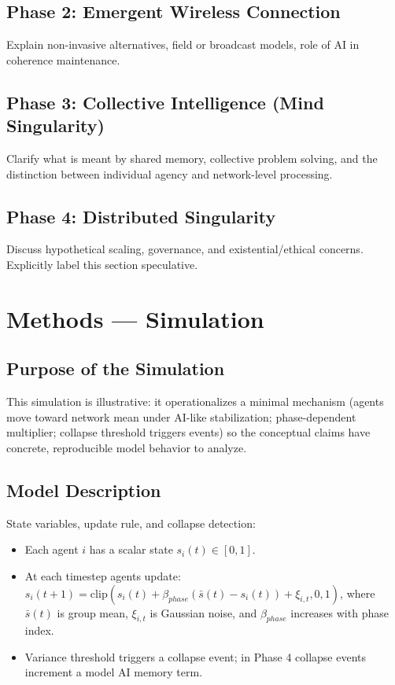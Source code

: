 \documentclass[12pt]{article}
\begin{document}
\subsection{Phase 2: Emergent Wireless Connection}
Explain non-invasive alternatives, field or broadcast models, role of AI in coherence maintenance.

\subsection{Phase 3: Collective Intelligence (Mind Singularity)}
Clarify what is meant by shared memory, collective problem solving, and the distinction between individual agency and network-level processing.

\subsection{Phase 4: Distributed Singularity}
Discuss hypothetical scaling, governance, and existential/ethical concerns. Explicitly label this section speculative.

\section{Methods — Simulation}
\subsection{Purpose of the Simulation}
This simulation is illustrative: it operationalizes a minimal mechanism (agents move toward network mean under AI-like stabilization; phase-dependent multiplier; collapse threshold triggers events) so the conceptual claims have concrete, reproducible model behavior to analyze.

\subsection{Model Description}
State variables, update rule, and collapse detection:
\begin{itemize}
  \item Each agent \(i\) has a scalar state \(s_i(t) \in [0,1]\).
  \item At each timestep agents update: \(s_i(t+1) = \mathrm{clip}( s_i(t) + \beta_{phase}( \bar{s}(t) - s_i(t)) + \xi_{i,t} , 0,1)\), where \(\bar{s}(t)\) is group mean, \(\xi_{i,t}\) is Gaussian noise, and \(\beta_{phase}\) increases with phase index.
  \item Variance threshold triggers a collapse event; in Phase 4 collapse events increment a model AI memory term.
\end{itemize}
\end{document}
